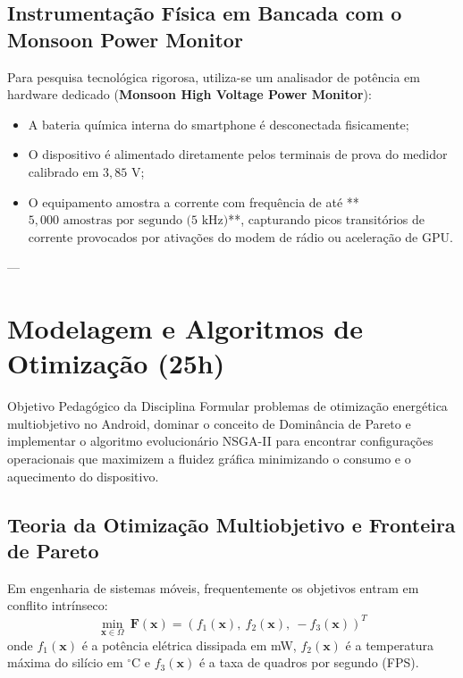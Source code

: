 \subsection{Instrumentação Física em Bancada com o Monsoon Power Monitor}
Para pesquisa tecnológica rigorosa, utiliza-se um analisador de potência em hardware dedicado (\textbf{Monsoon High Voltage Power Monitor}):
\begin{itemize}
    \item A bateria química interna do smartphone é desconectada fisicamente;
    \item O dispositivo é alimentado diretamente pelos terminais de prova do medidor calibrado em $3{,}85\text{ V}$;
    \item O equipamento amostra a corrente com frequência de até **$5{,}000\text{ amostras por segundo (5 kHz)}$**, capturando picos transitórios de corrente provocados por ativações do modem de rádio ou aceleração de GPU.
\end{itemize}

---

\section{Modelagem e Algoritmos de Otimização (25h)}

\begin{pedagogico}{Objetivo Pedagógico da Disciplina}
Formular problemas de otimização energética multiobjetivo no Android, dominar o conceito de Dominância de Pareto e implementar o algoritmo evolucionário NSGA-II para encontrar configurações operacionais que maximizem a fluidez gráfica minimizando o consumo e o aquecimento do dispositivo.
\end{pedagogico}

\subsection{Teoria da Otimização Multiobjetivo e Fronteira de Pareto}
Em engenharia de sistemas móveis, frequentemente os objetivos entram em conflito intrínseco:
\begin{equation}
    \min_{\mathbf{x} \in \Omega} \ \mathbf{F}(\mathbf{x}) = \left( f_1(\mathbf{x}), \ f_2(\mathbf{x}), \ -f_3(\mathbf{x}) \right)^T
\end{equation}
onde $f_1(\mathbf{x})$ é a potência elétrica dissipada em mW, $f_2(\mathbf{x})$ é a temperatura máxima do silício em $^\circ\text{C}$ e $f_3(\mathbf{x})$ é a taxa de quadros por segundo (FPS).

